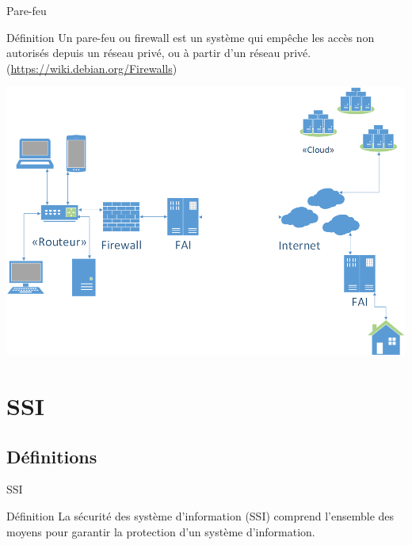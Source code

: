 \documentclass[12pt]{beamer}
\begin{document}
		\begin{frame}{Pare-feu}
			\begin{exampleblock}{Définition}
				Un \alert{pare-feu} ou \alert{firewall} est un système qui empêche les accès non autorisés depuis un réseau privé, ou à partir d'un réseau privé. (\url{https://wiki.debian.org/Firewalls})
			\end{exampleblock}
		\end{frame}
		
		\begin{frame}{}
			\begin{center}
				\includegraphics[scale=.35]{LAN-WAN.png}
			\end{center}
		\end{frame}


\section{SSI}
	
	\subsection{Définitions}

		\begin{frame}{SSI}
			\begin{exampleblock}{Définition}
				La \alert{sécurité des système d'information (SSI)} comprend l'ensemble des moyens pour garantir la protection d'un système d'information.
			\end{exampleblock}
		\end{frame}
		
\end{document}
